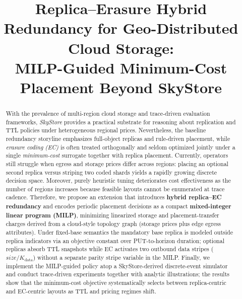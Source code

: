 \documentclass[conference]{IEEEtran}
\begin{document}
\title{Replica--Erasure Hybrid Redundancy for Geo-Distributed Cloud Storage:\\
MILP-Guided Minimum-Cost Placement Beyond SkyStore}

\author{
}

\maketitle

\begin{abstract}
With the prevalence of multi-region cloud storage and trace-driven evaluation frameworks, \emph{SkyStore} provides a practical substrate for reasoning about replication and TTL policies under heterogeneous regional prices.
Nevertheless, the baseline redundancy storyline emphasizes full-object replicas and rule-driven placement, while \emph{erasure coding (EC)} is often treated orthogonally and seldom optimized jointly under a single \emph{minimum-cost} surrogate together with replica placement.
Currently, operators still struggle when egress and storage prices differ across regions: placing an optional second replica versus striping two coded shards yields a rapidly growing discrete decision space.
Moreover, purely heuristic tuning deteriorates cost effectiveness as the number of regions increases because feasible layouts cannot be enumerated at trace cadence.
Therefore, we propose an extension that introduces \textbf{hybrid replica--EC redundancy} and encodes periodic placement decisions as a compact \textbf{mixed-integer linear program (MILP)}, minimizing linearized storage and placement-transfer charges derived from a cloud-style topology graph (storage prices plus edge egress attributes).
Under fixed-base semantics the mandatory base replica is modeled outside replica indicators via an objective constant over PUT-to-horizon duration; optional replicas absorb TTL snapshots while EC activates two outbound data stripes (\(size/K_{\mathrm{data}}\)) without a separate parity stripe variable in the MILP.
Finally, we implement the MILP-guided policy atop a SkyStore-derived discrete-event simulator and conduct trace-driven experiments together with analytic illustrations; the results show that the minimum-cost objective systematically selects between replica-centric and EC-centric layouts as TTL and pricing regimes shift.
\end{abstract}
\end{document}
